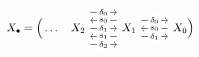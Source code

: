 \documentclass[crop,dvisvgm]{standalone}
\begin{document}
\[\begin {tikzcd}
      X_\bullet  = \Big (\ldots \quad 
      X_2
        \ar [r,"\delta _1" description]
        \ar [r,shift left=6,"\delta _0" description]
        \ar [r,shift right=6,"\delta _2" description]
      & X_1
        \ar [r,shift left=3,"\delta _0" description]
        \ar [r,shift right=3,"\delta _1" description]
        \ar [l,shift right=3,"s_0" description]
        \ar [l,shift left=3,"s_1" description]
      & X_0\Big )
        \ar [l,"s_0" description]
    \end {tikzcd}\]
\end{document}
